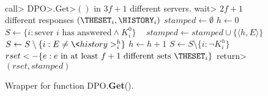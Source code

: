 \begin{figure}[ht]
  \begin{algorithm}[H]
    \caption{\small Wrapper for function DPO.\textbf{Get}().}~\label{DPO-wget}
    \begin{algorithmic}[1]
      \State \<call> \<DPO>.\<Get>\(()\) in \(3f+1\) different servers.
      \State \<wait> \(2f+1\) different responses $(\THESET_i, \HISTORY_i)$ %
      \State $stamped \leftarrow \emptyset$
      \State $h \leftarrow 0$
      \State $S \leftarrow \{ i : \text{sever } i \text{ has answered} \land K_i^{0}\}$
      ~\label{DPO-bwhile}
        \State $stamped \leftarrow stamped \cup \{ \langle h, E \rangle \} $
        \State $S \leftarrow S \setminus \{ i : E \neq \<history>_i^h\}$ 
        \State $h \leftarrow h+1$
        \State $S \leftarrow S \setminus \{ i : \neg K_i^{h}\}$ 
      \EndWhile~\label{DPO-ewhile}
      \State \(rset <- \{ e : e \text{ in at least } f+1 \text{ different sets } \THESET_i\}\)
      \State \<return> $(rset, stamped)$
      \EndFunction
		\end{algorithmic}
	\end{algorithm}\vspace{-2em}
\end{figure}

